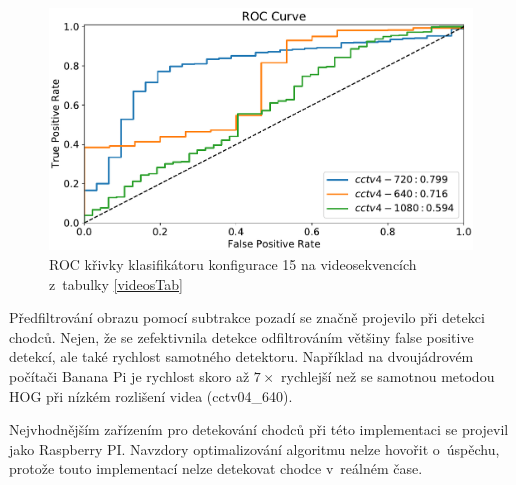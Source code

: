 \begin{figure}[H]
\centering
\includegraphics[width=16cm]{figures/roc2.pdf}
\caption{ROC křivky klasifikátoru konfigurace 15 na videosekvencích z~tabulky \ref{videosTab}}
\label{fig:rocCurve2}
\end{figure}

Předfiltrování obrazu pomocí subtrakce pozadí se značně projevilo při detekci chodců. Nejen, že se zefektivnila detekce odfiltrováním většiny false positive detekcí, ale také rychlost samotného detektoru. Například na dvoujádrovém počítači Banana Pi je rychlost skoro až $7\times$ rychlejší než se samotnou metodou HOG při nízkém rozlišení videa (cctv04\_640).

Nejvhodnějším zařízením pro detekování chodců při této implementaci se projevil jako Raspberry PI. Navzdory optimalizování algoritmu nelze hovořit o~úspěchu, protože touto implementací nelze detekovat chodce v~reálném čase.